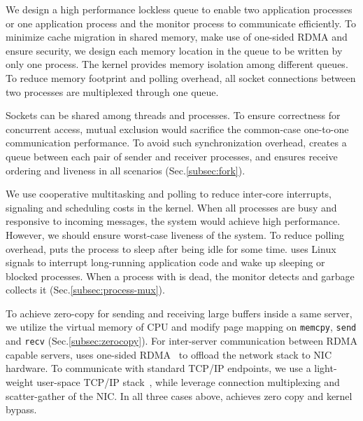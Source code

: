 We design a high performance lockless queue to enable two application processes or one application process and the monitor process to communicate efficiently. To minimize cache migration in shared memory, make use of one-sided RDMA and ensure security, we design each memory location in the queue to be written by only one process. The kernel provides memory isolation among different queues. To reduce memory footprint and polling overhead, all socket connections between two processes are multiplexed through one queue.

Sockets can be shared among threads and processes. To ensure correctness for concurrent access, mutual exclusion would sacrifice the common-case one-to-one communication performance. To avoid such synchronization overhead, \libipc creates a queue between each pair of sender and receiver processes, and ensures receive ordering and liveness in all scenarios (Sec.\ref{subsec:fork}).

We use cooperative multitasking and polling to reduce inter-core interrupts, signaling and scheduling costs in the kernel. When all processes are busy and responsive to incoming messages, the system would achieve high performance. However, we should ensure worst-case liveness of the system. To reduce polling overhead, \libipc puts the process to sleep after being idle for some time. \libipc uses Linux signals to interrupt long-running application code and wake up sleeping or blocked processes. When a process with \libipc is dead, the monitor detects and garbage collects it (Sec.\ref{subsec:process-mux}).

To achieve zero-copy for sending and receiving large buffers inside a same server, we utilize the virtual memory of CPU and modify page mapping on \texttt{memcpy}, \texttt{send} and \texttt{recv} (Sec.\ref{subsec:zerocopy}). For inter-server communication between RDMA capable servers, \libipc{} uses one-sided RDMA~\cite{mitchell2013using,kaminsky2016design} to offload the network stack to NIC hardware. To communicate with standard TCP/IP endpoints, we use a light-weight user-space TCP/IP stack~\cite{dunkels2001design}, while leverage connection multiplexing and scatter-gather of the NIC. In all three cases above, \libipc{} achieves zero copy and kernel bypass.



